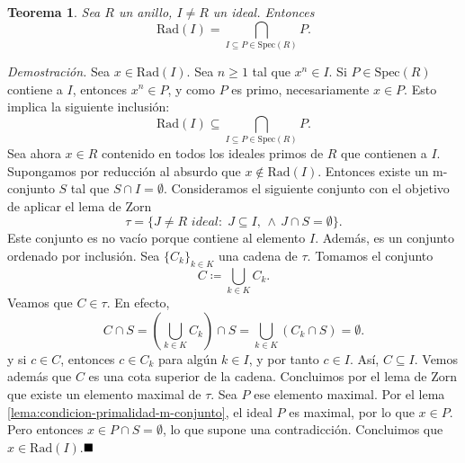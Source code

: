 \documentclass[11pt]{book}
\def\Spec{\mathrm{Spec}}
\def\Rad{\mathrm{Rad}}
\def\qed{\hfill\blacksquare}
\newtheorem{theorem}{Teorema}[section]
\theoremstyle{definition}
\begin{document}
\begin{theorem}
    Sea $R$ un anillo, $I\neq R$ un ideal. Entonces \[
    \Rad(I)=\bigcap_{I\subseteq P\in\Spec(R)}P.
    \]
\end{theorem}
\noindent\textit{Demostración.} Sea $x\in \Rad(I)$. Sea $n\geq 1$ tal que $x^n\in I$. Si $P\in\Spec(R)$ contiene a $I$, entonces $x^n\in P$, y como $P$ es primo, necesariamente $x\in P$. Esto implica la siguiente inclusión:\[
    \Rad(I)\subseteq\bigcap_{I\subseteq P\in\Spec(R)}P.
\]Sea ahora $x\in R$ contenido en todos los ideales primos de $R$ que contienen a $I$. Supongamos por reducción al absurdo que $x\notin \Rad(I)$. Entonces existe un m-conjunto $S$ tal que $S\cap I=\emptyset$. Consideramos el siguiente conjunto con el objetivo de aplicar el lema de Zorn\[
\tau=\{J\neq R\textit{ ideal}:\; J\subseteq I,\,\land\, J\cap S=\emptyset\}.
\]Este conjunto es no vacío porque contiene al elemento $I$. Además, es un conjunto ordenado por inclusión. Sea $\{C_k\}_{k\in K}$ una cadena de $\tau$. Tomamos el conjunto\[
C\coloneq\bigcup_{k\in K}C_k.
\]Veamos que $C\in \tau$. En efecto,\[
C\cap S=\left(\bigcup_{k\in K}C_k\right)\cap S=\bigcup_{k\in K}(C_k\cap S)=\emptyset.
\]y si $c\in C$, entonces $c\in C_k$ para algún $k\in I$, y por tanto $c\in I$. Así, $C\subseteq I$. Vemos además que $C$ es una cota superior de la cadena. Concluimos por el lema de Zorn que existe un elemento maximal de $\tau$. Sea $P$ ese elemento maximal. Por el lema \ref{lema:condicion-primalidad-m-conjunto}, el ideal $P$ es maximal, por lo que $x\in P$. Pero entonces $x\in P\cap S=\emptyset$, lo que supone una contradicción. Concluimos que $x\in\Rad(I)$.$\qed$
\end{document}
